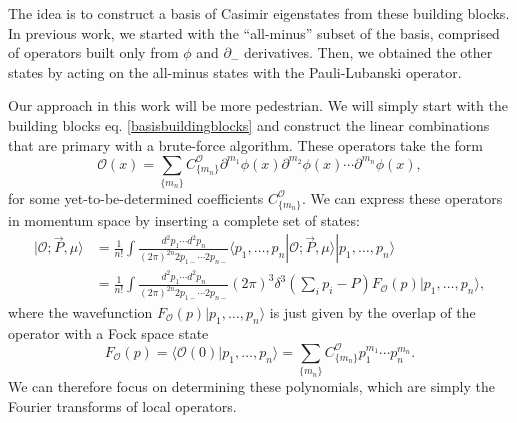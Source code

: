 The idea is to construct a basis of Casimir eigenstates from these building 
blocks. In previous work, we started with the ``all-minus'' subset of the basis, 
comprised of operators built only from $\phi$ and $\partial_-$ derivatives. 
Then, we obtained the other states by acting on the all-minus states with the 
Pauli-Lubanski operator.

Our approach in this work will be more pedestrian. We will simply start with the 
building blocks eq. \eqref{basisbuildingblocks} and construct the linear 
combinations that are primary with a brute-force algorithm. These operators take 
the form 
\begin{equation}
    \mathcal{O}(x) = \sum_{\{ m_n \}} C^{\mathcal{O}}_{\{m_n\}} \partial^{m_1} \phi(x) \partial^{m_2} \phi(x) \dotsb \partial^{m_n} \phi(x),
\end{equation} 
for some yet-to-be-determined coefficients $C^{\mathcal{O}}_{\{m_n\}}$. We can 
express these operators in momentum space by inserting a complete set of states: 
\begin{equation}
    \begin{aligned}
        | \mathcal{O} ; \vec{P}, \mu \rangle &= \frac{1}{n!} \int \frac{d^2 p_1 \dotsb d^2 p_n}{(2\pi)^{2n} 2p_{1-} \dotsb 2p_{n-}} \langle p_1, \dots, p_n | \mathcal{O} ;\vec{P}, \mu \rangle | p_1, \dots, p_n \rangle \\
        &= \frac{1}{n!}\int \frac{d^2 p_1 \dotsb d^2 p_n}{(2\pi)^{2n} 2p_{1-} \dotsb 2p_{n-}} (2\pi)^3 \delta^3 \left(\sum_i p_i - P \right) F_{\mathcal{O}}(p)| p_1, \dots, p_n \rangle, \label{contstatedef}
    \end{aligned}
\end{equation} 
where the wavefunction $ F_{\mathcal{O}}(p)| p_1, \dots, p_n \rangle$ is just 
given by the overlap of the operator with a Fock space state 
\begin{equation}
    F_{\mathcal{O}}(p) = \langle \mathcal{O}(0) | p_1, \dots, p_n \rangle = \sum_{\{ m_n \}} C^{\mathcal{O}}_{\{m_n\}} p_1^{m_1} \dotsb p_n^{m_n}.
\end{equation} 
We can therefore focus on determining these polynomials, which are simply the 
Fourier transforms of local operators.

